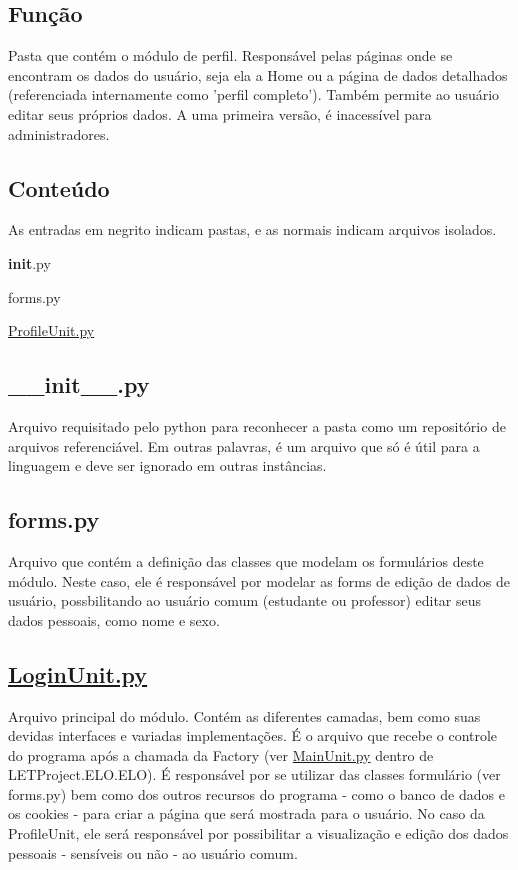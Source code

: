 \subsection*{Função}

Pasta que contém o módulo de perfil. Responsável pelas páginas onde se encontram os dados do usuário, seja ela a Home ou a página de dados detalhados (referenciada internamente como 'perfil completo'). Também permite ao usuário editar seus próprios dados. A uma primeira versão, é inacessível para administradores.

\subsection*{Conteúdo}

As entradas em negrito indicam pastas, e as normais indicam arquivos isolados.


\begin{DoxyItemize}
\item {\bfseries init}.py
\item forms.\-py
\item \hyperlink{ProfileUnit_8py}{Profile\-Unit.\-py}
\end{DoxyItemize}

\subsection*{\-\_\-\-\_\-init\-\_\-\-\_\-.\-py}

Arquivo requisitado pelo python para reconhecer a pasta como um repositório de arquivos referenciável. Em outras palavras, é um arquivo que só é útil para a linguagem e deve ser ignorado em outras instâncias.

\subsection*{forms.\-py}

Arquivo que contém a definição das classes que modelam os formulários deste módulo. Neste caso, ele é responsável por modelar as forms de edição de dados de usuário, possbilitando ao usuário comum (estudante ou professor) editar seus dados pessoais, como nome e sexo.

\subsection*{\hyperlink{LoginUnit_8py}{Login\-Unit.\-py}}

Arquivo principal do módulo. Contém as diferentes camadas, bem como suas devidas interfaces e variadas implementações. É o arquivo que recebe o controle do programa após a chamada da Factory (ver \hyperlink{MainUnit_8py}{Main\-Unit.\-py} dentro de L\-E\-T\-Project.\-E\-L\-O.\-E\-L\-O). É responsável por se utilizar das classes formulário (ver forms.\-py) bem como dos outros recursos do programa -\/ como o banco de dados e os cookies -\/ para criar a página que será mostrada para o usuário. No caso da Profile\-Unit, ele será responsável por possibilitar a visualização e edição dos dados pessoais -\/ sensíveis ou não -\/ ao usuário comum. 